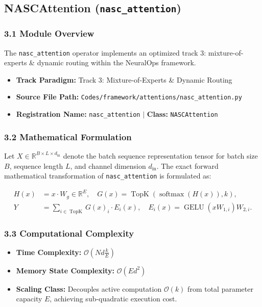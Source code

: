 \subsection{NASCAttention (\texttt{nasc\_attention})}
\label{sec:app_module_nasc\_attention}

\subsubsection*{3.1 Module Overview}
The \texttt{nasc\_attention} operator implements an optimized track 3: mixture-of-experts \& dynamic routing within the NeuralOps framework.
\begin{itemize}
    \item \textbf{Track Paradigm:} Track 3: Mixture-of-Experts & Dynamic Routing
    \item \textbf{Source File Path:} \texttt{Codes/framework/attentions/nasc\_attention.py}
    \item \textbf{Registration Name:} \texttt{nasc\_attention} $\mid$ \textbf{Class:} \texttt{NASCAttention}
\end{itemize}

\subsubsection*{3.2 Mathematical Formulation}
Let $X \in \mathbb{R}^{B \times L \times d_{\text{in}}}$ denote the batch sequence representation tensor for batch size $B$, sequence length $L$, and channel dimension $d_{\text{in}}$. The exact forward mathematical transformation of \texttt{nasc\_attention} is formulated as:

\begin{align}
H(x) &= x \cdot W_g \in \mathbb{R}^{E}, \quad G(x) = \operatorname{TopK}\left(\operatorname{softmax}(H(x)), k\right), \\
Y &= \sum_{i \in \operatorname{TopK}} G(x)_i \cdot E_i(x), \quad E_i(x) = \operatorname{GELU}(x W_{1, i}) W_{2, i}.
\end{align}


\subsubsection*{3.3 Computational Complexity}
\begin{itemize}
    \item \textbf{Time Complexity:} $\mathcal{O}(N d \frac{k}{E})$
    \item \textbf{Memory State Complexity:} $\mathcal{O}(E d^2)$
    \item \textbf{Scaling Class:} Decouples active computation $\mathcal{O}(k)$ from total parameter capacity $E$, achieving sub-quadratic execution cost.
\end{itemize}


